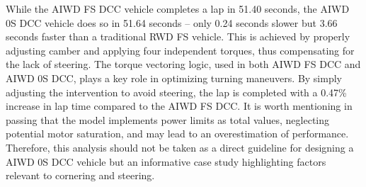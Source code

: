 While the AIWD FS DCC vehicle completes a lap in 51.40 seconds, the AIWD 0S DCC vehicle does so in 51.64 seconds -- only 0.24 seconds slower but 3.66 seconds faster than a traditional RWD FS vehicle. This is achieved by properly adjusting camber and applying four independent torques, thus compensating for the lack of steering. The torque vectoring logic, used in both AIWD FS DCC and AIWD 0S DCC, plays a key role in optimizing turning maneuvers. By simply adjusting the intervention to avoid steering, the lap is completed with a 0.47\% increase in lap time compared to the AIWD FS DCC.
It is worth mentioning in passing that the model implements power limits as total values, neglecting potential motor saturation, and may lead to an overestimation of performance.
Therefore, this analysis should not be taken as a direct guideline for designing a AIWD 0S DCC vehicle but an informative case study highlighting factors relevant to cornering and steering.

